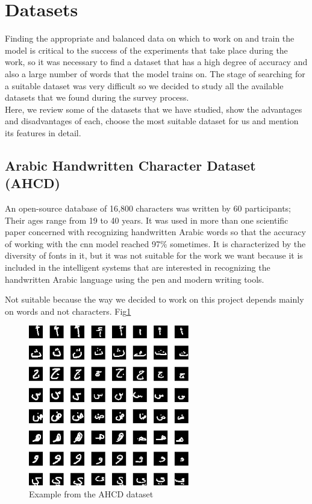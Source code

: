 \section{Datasets}
Finding the appropriate and balanced data on which to work on and train the model is critical to the success of the experiments that take place during the work, so it was necessary to find a dataset that has a high degree of accuracy and also a large number of words that the model trains on. The stage of searching for a suitable dataset was very difficult so we decided to study all the available datasets that we found during the survey process. \\

Here, we review some of the datasets that we have studied, show the advantages and disadvantages of each, choose the most suitable dataset for us and mention its features in detail.

\subsection{Arabic Handwritten Character Dataset (AHCD)}
An open-source database of 16,800 characters was written by 60 participants; Their ages range from 19 to 40 years. It was used in more than one scientific paper concerned with recognizing handwritten Arabic words so that the accuracy of working with the \acrshort{cnn} model reached 97\% sometimes.\cite{altwaijry2021arabic} It is characterized by the diversity of fonts in it, but it was not suitable for the work we want because it is included in the intelligent systems that are interested in recognizing the handwritten Arabic language using the pen and modern writing tools. 

Not suitable because the way we decided to work on this project depends mainly on words and not characters. Fig\ref{fig:AHCD sample}

\begin{figure}[!htb]
    \centering
    \includegraphics[width=7cm]{images/AHCD sample.png}
    \caption{Example from the AHCD dataset}
    \label{fig:AHCD sample}
\end{figure}


